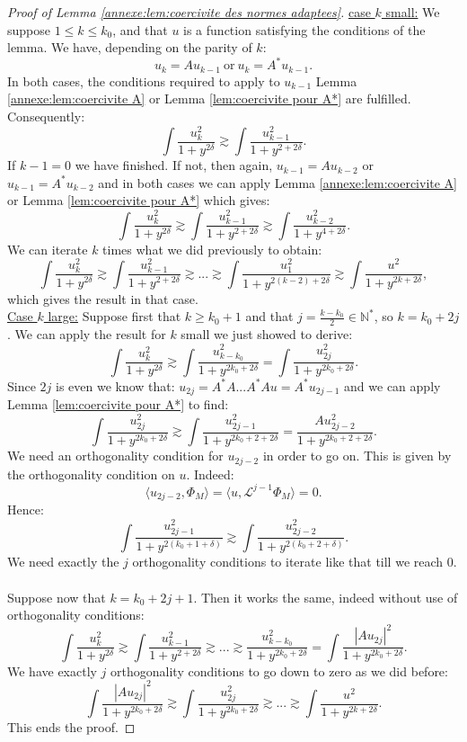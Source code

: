 \documentclass[11pt,a4paper,reqno]{amsart}
\theoremstyle{remark}
\numberwithin{equation}{section}
\begin{document}
\begin{appendix}
\begin{proof}[Proof of Lemma \ref{annexe:lem:coercivite des normes adaptees}]
\underline{case $k$ small:} We suppose $1\leq k\leq k_0$, and that $u$ is a function satisfying the conditions of the lemma. We have, depending on the parity of $k$:
$$
u_k=A u_{k-1} \ \text{or} \ u_k=A^* u_{k-1} .
$$
In both cases, the conditions required to apply to $u_{k-1}$ Lemma \ref{annexe:lem:coercivite A} or Lemma \ref{lem:coercivite pour A*} are fulfilled. Consequently:
$$
\int \frac{u_{k}^2}{1+y^{2\delta}} \gtrsim \int \frac{u_{k-1}^2}{1+y^{2+2\delta}} .
$$
If $k-1=0$ we have finished. If not, then again, $u_{k-1}=Au_{k-2}$ or $u_{k-1}=A^* u_{k-2}$ and in both cases we can apply Lemma \ref{annexe:lem:coercivite A} or Lemma \ref{lem:coercivite pour A*} which gives:
$$
\int \frac{u_k^2}{1+y^{2\delta}} \gtrsim \int \frac{u_{k-1}^2}{1+y^{2+2\delta}} \gtrsim \int \frac{u_{k-2}^2}{1+y^{4+2\delta}} .
$$
We can iterate $k$ times what we did previously to obtain:
$$
\int \frac{u_k^2}{1+y^{2\delta}} \gtrsim \int \frac{u_{k-1}^2}{1+y^{2+2\delta}} \gtrsim ... \gtrsim \int \frac{u_1^2}{1+y^{2(k-2)+2\delta}} \gtrsim \int \frac{u^2}{1+y^{2k+2\delta}} ,
$$
which gives the result in that case.\\

\underline{Case $k$ large:} Suppose first that $k\geq k_0+1$ and that $j=\frac{k-k_0}{2} \in \mathbb{N}^*$, so $k=k_0+2j$. We can apply the result for $k$ small we just showed to derive:
$$
\int \frac{u_k^2}{1+y^{2\delta}} \gtrsim \int \frac{u_{k-k_0}^2}{1+y^{2k_0+2\delta}}= \int \frac{u_{2j}^2}{1+y^{2k_0+2\delta}} .
$$
Since $2j$ is even we know that: $u_{2j}=A^*A...A^*Au=A^* u_{2j-1}$ and we can apply Lemma \ref{lem:coercivite pour A*} to find:
$$
\int \frac{u_{2j}^2}{1+y^{2k_0+2\delta}}\gtrsim \int \frac{u_{2j-1}^2}{1+y^{2k_0+2+2\delta}}= \frac{Au_{2j-2}^2}{1+y^{2k_0+2+2\delta}} .
$$
We need an orthogonality condition for $u_{2j-2}$ in order to go on. This is given by the orthogonality condition on $u$. Indeed:
$$
\langle u_{2j-2},\Phi_M \rangle= \langle u, \mathcal{L}^{j-1}\Phi_M \rangle=0 .
$$
Hence:
$$
\int \frac{u_{2j-1}^2}{1+y^{2(k_0+1+\delta)}}\gtrsim \int \frac{u_{2j-2}^2}{1+y^{2(k_0+2+\delta)}} .
$$
We need exactly the $j$ orthogonality conditions to iterate like that till we reach $0$.\\
\\
Suppose now that $k=k_0+2j+1$. Then it works the same, indeed without use of orthogonality conditions:
$$
\int \frac{u_k^2}{1+y^{2\delta}} \gtrsim \int \frac{u_{k-1}^2}{1+y^{2+2\delta}}\gtrsim... \gtrsim \frac{u_{k-k_0}^2}{1+y^{2k_0+2\delta}}= \int \frac{|Au_{2j}|^2}{1+y^{2k_0+2\delta}} .
$$
We have exactly $j$ orthogonality conditions to go down to zero as we did before:
$$
\int \frac{|Au_{2j}|^2}{1+y^{2k_0+2\delta}}\gtrsim \int \frac{u_{2j}^2}{1+y^{2k_0+2\delta}}\gtrsim... \gtrsim \int \frac{u^2}{1+y^{2k+2\delta}} .
$$
This ends the proof.
\end{proof}


\end{appendix}
\end{document}
